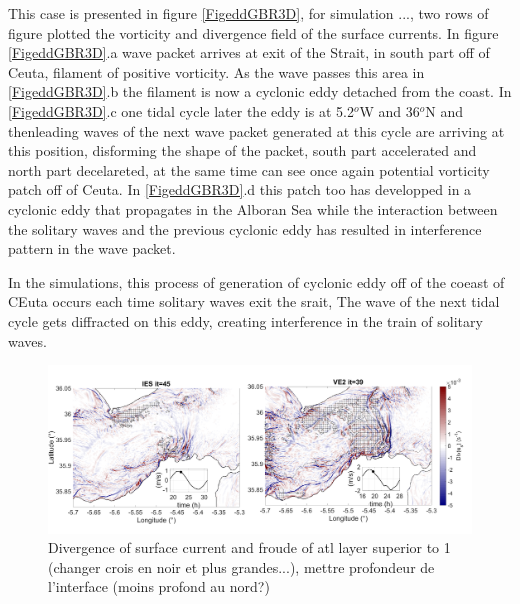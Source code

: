 This case is presented in figure \ref{FigeddGBR3D}, for simulation ...,  two rows of figure plotted the vorticity and divergence field of the surface currents. In figure \ref{FigeddGBR3D}.a wave packet arrives at exit of the Strait, in south part off of Ceuta, filament of positive vorticity. As the wave passes this area in \ref{FigeddGBR3D}.b the filament is now a cyclonic eddy detached from the coast. In \ref{FigeddGBR3D}.c one tidal cycle later the eddy is at 5.2$^o$W and 36$^o$N and thenleading waves of the next wave packet generated at this cycle are arriving at this position, disforming the shape of the packet, south part accelerated and north part decelareted, at the same time can see once again potential vorticity patch off of Ceuta. In \ref{FigeddGBR3D}.d this patch too has developped in a cyclonic eddy that propagates in the Alboran Sea while the interaction between the solitary waves and the previous cyclonic eddy has resulted in interference pattern in the wave packet. 

In the simulations, this process of generation of cyclonic eddy off of the coeast of CEuta occurs each time solitary waves exit the srait,  The wave of the next tidal cycle gets diffracted on this eddy, creating interference in the train of solitary waves.



\begin{figure}[!h]
 \centering
\includegraphics[width=\linewidth]{./GBR3D/FigWaveCont.png}
 \caption {Divergence of surface current and froude of atl layer superior to 1 (changer crois en noir et plus grandes...), mettre profondeur de l'interface (moins profond au nord?)}
 \label{FigISWGBR3D}
\end{figure}






